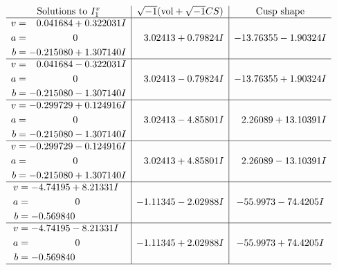 \documentclass[1p]{elsarticle_modified}
\theoremstyle{definition}
\newcommand{\I}{\sqrt{-1}}
\begin{document}
$$\begin{array}{c|c|c}  
\text{Solutions to }I^v_{1}& \I (\text{vol} + \sqrt{-1}CS) & \text{Cusp shape}\\
 \hline 
\begin{aligned}
v &= \phantom{-}0.041684 + 0.322031 I \\
a &= \phantom{-0.000000 } 0 \\
b &= -0.215080 + 1.307140 I\end{aligned}
 & \phantom{-}3.02413 + 0.79824 I & -13.76355 - 1.90324 I \\ \hline\begin{aligned}
v &= \phantom{-}0.041684 - 0.322031 I \\
a &= \phantom{-0.000000 } 0 \\
b &= -0.215080 - 1.307140 I\end{aligned}
 & \phantom{-}3.02413 - 0.79824 I & -13.76355 + 1.90324 I \\ \hline\begin{aligned}
v &= -0.299729 + 0.124916 I \\
a &= \phantom{-0.000000 } 0 \\
b &= -0.215080 - 1.307140 I\end{aligned}
 & \phantom{-}3.02413 - 4.85801 I & \phantom{-}2.26089 + 13.10391 I \\ \hline\begin{aligned}
v &= -0.299729 - 0.124916 I \\
a &= \phantom{-0.000000 } 0 \\
b &= -0.215080 + 1.307140 I\end{aligned}
 & \phantom{-}3.02413 + 4.85801 I & \phantom{-}2.26089 - 13.10391 I \\ \hline\begin{aligned}
v &= -4.74195 + 8.21331 I \\
a &= \phantom{-0.000000 } 0 \\
b &= -0.569840\phantom{ +0.000000I}\end{aligned}
 & -1.11345 - 2.02988 I & -55.9973 - 74.4205 I \\ \hline\begin{aligned}
v &= -4.74195 - 8.21331 I \\
a &= \phantom{-0.000000 } 0 \\
b &= -0.569840\phantom{ +0.000000I}\end{aligned}
 & -1.11345 + 2.02988 I & -55.9973 + 74.4205 I\\
 \hline 
 \end{array}$$\newpage
\end{document}
